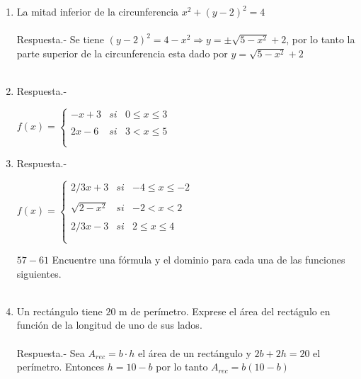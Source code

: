 \begin{enumerate}
    \item La mitad inferior de la circunferencia $x^2 + (y-2)^2 = 4$\\\\
	Respuesta.-\; Se tiene $(y-2)^2 = 4 -x^2 \Longrightarrow y = \pm \sqrt{5-x^2} + 2$, por lo tanto la parte superior de la circunferencia esta dado por $y=\sqrt{5-x^2} + 2$\\\\

    \item Respuesta.-\;  \begin{center}$ f(x) = \left\{ \begin{array}{rcl}
	    -x+3&si&0 \leq x \leq 3\\
	    \\ 2x-6&si&3<x\leq 5\\\\
    \end{array} \right.$ \end{center}

    \item Respuesta.-\;  \begin{center}$ f(x) = \left\{ \begin{array}{rcl}
	    2/3 x + 3&si&-4\leq x \leq -2\\
	    \\ \sqrt{2-x^2}&si& -2 < x < 2\\
	    \\ 2/3x-3&si& 2\leq x \leq 4\\\\
    \end{array} \right.$ \end{center}
    \vspace{.5cm}
 
    $57-61$ Encuentre una fórmula y el dominio para cada una de las funciones siguientes.\\\\

    \item Un rectángulo tiene $20$ m de perímetro. Exprese el área del rectágulo en función de la longitud de uno de sus lados.\\\\
	Respuesta.-\; Sea $A_{rec} = b\cdot h$ el área de un rectángulo y $2b+2h=20$ el perímetro. Entonces $h=10-b$ por lo tanto $A_{rec}=b(10-b)$\\\\  


\end{enumerate}
